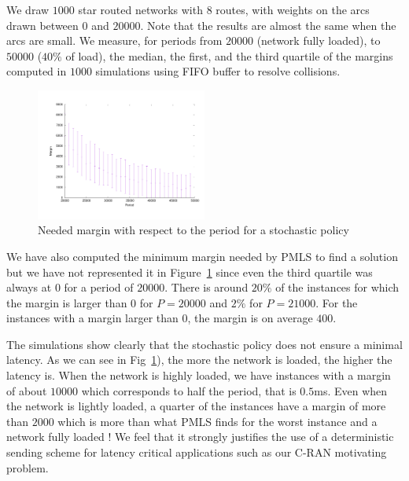 \documentclass[10pt, conference, letterpaper]{IEEEtran}
\begin{document}
     
     We draw $1000$ star routed networks with $8$ routes, with weights on the arcs drawn between $0$ and $20000$. Note that the results are almost the same when the arcs are small. We measure, for periods from $20000$ (network fully loaded), to $50000$ ($40 \%$ of load), the median, the first, and the third quartile of the margins computed in $1000$ simulations using FIFO buffer to resolve collisions.
     
      
    \begin{figure}[H] 

       \begin{center}
      \includegraphics[width = 0.5\textwidth]{stochastic.pdf}
      \end{center}
      \caption{Needed margin with respect to the period for a stochastic policy}
      \label{fig:sto}
     \end{figure}
     
     We have also computed the minimum margin needed by PMLS to find a solution but we have not represented it in Figure~\ref{fig:sto} since even the third quartile was always at $0$ for a period of $20000$.
     There is around $20\%$ of the instances for which the margin is larger than $0$ for $P=20000$ and $2\%$
     for $P = 21000$. For the instances with a margin larger than $0$, the margin is on average $400$.
     
     The simulations show clearly that the stochastic policy does not ensure a minimal latency. As we can see in Fig~\ref{fig:sto}), the more the network is loaded, the higher the latency is. When the network is highly loaded,
     we have instances with a margin of about $10000$ which corresponds to half the period, that is $0.5$ms. 
     Even when the network is lightly loaded, a quarter of the instances have a margin of more than $2000$
     which is more than what PMLS finds for the worst instance and a network fully loaded ! 
     We feel that it strongly justifies the use of a deterministic sending scheme for latency critical applications such as our C-RAN motivating problem.
     
\end{document}
